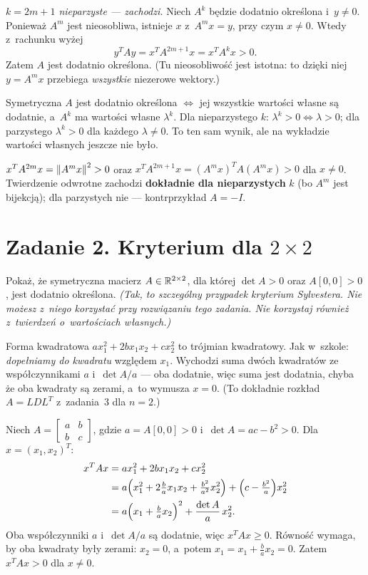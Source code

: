 \documentclass[11pt]{article}
\begin{document}
\emph{$k=2m+1$ nieparzyste --- zachodzi.} Niech $A^k$ będzie dodatnio
określona i~$y\ne0$. Ponieważ $A^m$ jest nieosobliwa, istnieje $x$
z~$A^mx=y$, przy czym $x\ne0$. Wtedy z~rachunku wyżej
\[
y^TAy=x^TA^{2m+1}x=x^TA^kx>0.
\]
Zatem $A$ jest dodatnio określona. (Tu nieosobliwość jest istotna: to
dzięki niej $y=A^mx$ przebiega \emph{wszystkie} niezerowe wektory.)

\begin{uwaga}
Symetryczna $A$ jest dodatnio określona $\iff$ jej wszystkie wartości
własne są dodatnie, a~$A^k$ ma wartości własne $\lambda^k$. Dla
nieparzystego $k$: $\lambda^k>0\iff\lambda>0$; dla parzystego $\lambda^k>0$
dla każdego $\lambda\ne0$. To ten sam wynik, ale na wykładzie wartości
własnych jeszcze nie było.
\end{uwaga}

\begin{odpowiedz}
$x^TA^{2m}x=\left\lVert A^mx \right\rVert^2>0$ oraz $x^TA^{2m+1}x=(A^mx)^TA(A^mx)>0$ dla
$x\ne0$. Twierdzenie odwrotne zachodzi \textbf{dokładnie dla nieparzystych}
$k$ (bo $A^m$ jest bijekcją); dla parzystych nie --- kontrprzykład $A=-I$.
\end{odpowiedz}

\section{Zadanie 2. Kryterium dla \texorpdfstring{$2\times2$}{2x2}}
\begin{tresc}
Pokaż, że symetryczna macierz $A\in\mathbb{R}^{2\times2}$, dla której $\det A>0$
oraz $A[0,0]>0$, jest dodatnio określona. \emph{(Tak, to szczególny
przypadek kryterium Sylvestera. Nie możesz z~niego korzystać przy
rozwiązaniu tego zadania. Nie korzystaj również z~twierdzeń o~wartościach
własnych.)}
\end{tresc}

\begin{intuicja}
Forma kwadratowa $ax_1^2+2bx_1x_2+cx_2^2$ to trójmian kwadratowy.
Jak w~szkole: \emph{dopełniamy do kwadratu} względem $x_1$. Wychodzi suma
dwóch kwadratów ze współczynnikami $a$ i~$\det A/a$ --- oba dodatnie, więc
suma jest dodatnia, chyba że oba kwadraty są zerami, a~to wymusza $x=0$.
(To dokładnie rozkład $A=LDL^T$ z~zadania~3 dla $n=2$.)
\end{intuicja}

\formalnie
Niech $A=\left[\begin{smallmatrix}a&b\\b&c\end{smallmatrix}\right]$,
gdzie $a=A[0,0]>0$ i~$\det A=ac-b^2>0$. Dla $x=(x_1,x_2)^T$:
\begin{align*}
x^TAx&=ax_1^2+2bx_1x_2+cx_2^2\\
&=a\Bigl(x_1^2+2\tfrac ba x_1x_2+\tfrac{b^2}{a^2}x_2^2\Bigr)
+\Bigl(c-\tfrac{b^2}a\Bigr)x_2^2\\
&=a\Bigl(x_1+\tfrac bax_2\Bigr)^2+\frac{\det A}{a}\,x_2^2.
\end{align*}
Oba współczynniki $a$ i~$\det A/a$ są dodatnie, więc $x^TAx\ge0$.
Równość wymaga, by oba kwadraty były zerami: $x_2=0$, a~potem
$x_1=x_1+\tfrac bax_2=0$. Zatem $x^TAx>0$ dla $x\ne0$.
\end{document}
